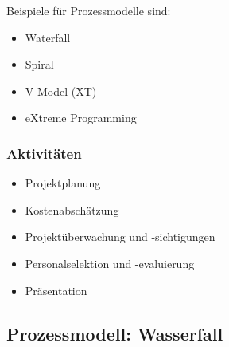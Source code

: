 \documentclass[ngerman,color=3b]{tuda_summary}
\begin{document}
Beispiele für Prozessmodelle sind:
\begin{itemize}
    \item Waterfall
    \item Spiral
    \item V-Model (XT)
    \item eXtreme Programming
\end{itemize}

\subsubsection{Aktivitäten}
\begin{itemize}
    \item Projektplanung
    \item Kostenabschätzung
    \item Projektüberwachung und -sichtigungen
    \item Personalselektion und -evaluierung
    \item Präsentation
\end{itemize}



\subsection{Prozessmodell: Wasserfall}
\end{document}
